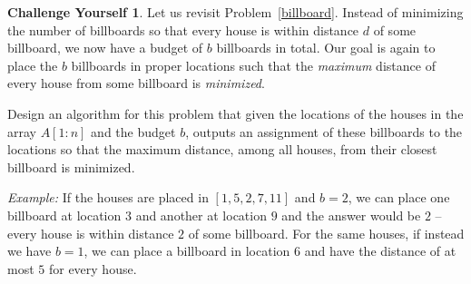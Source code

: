 \documentclass{article}
\theoremstyle{definition}
\newtheorem*{challenge}{Challenge Yourself}
\begin{document}
\begin{challenge}
	Let us revisit Problem~\ref{billboard}. Instead of minimizing the number of billboards so that every house is within distance $d$ of some billboard, we now have a budget of $b$ billboards in total. Our goal is again to place the $b$ billboards in proper 
	locations such that the \emph{maximum} distance of every house from some billboard is \emph{minimized}. 
	
	Design an algorithm for this problem that given the locations of the houses in the array $A[1:n]$ and the budget $b$, outputs an assignment of these billboards to the locations so that the maximum distance, among all houses, from their closest billboard is 
	minimized.  
	
\emph{Example:} If the houses are placed in $[1,5,2,7,11]$ and $b=2$, we can place one billboard at location $3$ and another at location $9$ and the answer would be $2$ -- every house is within distance $2$ of some billboard. 
For the same houses, if instead we have $b=1$, we can place a billboard in location $6$ and have the distance of at most $5$ for every house.  
\end{challenge}
\end{document}
